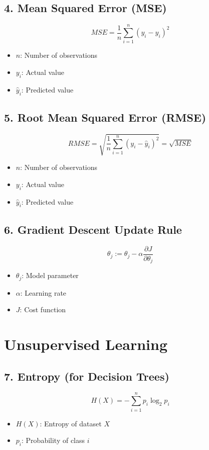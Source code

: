 \documentclass{article}
\begin{document}
\subsection{4. Mean Squared Error (MSE)}
\begin{equation}
MSE = \frac{1}{n} \sum_{i=1}^{n} (y_i - \hat{y}_i)^2
\end{equation}
\begin{itemize}
    \item \(n\): Number of observations
    \item \(y_i\): Actual value
    \item \(\hat{y}_i\): Predicted value
\end{itemize}

\subsection{5. Root Mean Squared Error (RMSE)}
\begin{equation}
RMSE = \sqrt{\frac{1}{n} \sum_{i=1}^{n} (y_i - \hat{y}_i)^2} = \sqrt{MSE}
\end{equation}
\begin{itemize}
    \item \(n\): Number of observations
    \item \(y_i\): Actual value
    \item \(\hat{y}_i\): Predicted value
\end{itemize}

\subsection{6. Gradient Descent Update Rule}
\begin{equation}
\theta_j := \theta_j - \alpha \frac{\partial J}{\partial \theta_j}
\end{equation}
\begin{itemize}
    \item \(\theta_j\): Model parameter
    \item \(\alpha\): Learning rate
    \item \(J\): Cost function
\end{itemize}

\section{Unsupervised Learning}

\subsection{7. Entropy (for Decision Trees)}
\begin{equation}
H(X) = - \sum_{i=1}^{n} p_i \log_2 p_i
\end{equation}
\begin{itemize}
    \item \(H(X)\): Entropy of dataset \(X\)
    \item \(p_i\): Probability of class \(i\)
\end{itemize}
\end{document}
